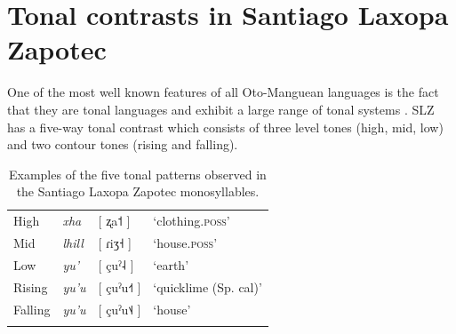 
\section{Tonal contrasts in Santiago Laxopa Zapotec} \label{sec:SLZ-tones}
One of the most well known features of all Oto-Manguean languages is the fact that they are tonal languages and exhibit a large range of tonal systems \citep{pikeProblemsZapotecTone1948,renschComparativeOtomangueanPhonology1976,josserandMixtecDialectHistory1983,silvermanLaryngealComplexityOtomanguean1997,beamdeazconaProblemsZapotecTone2007,dicanioItunyosoTrique2010,dicanioCoarticulationToneGlottal2012,elliottChicahuaxtlaTriqui2016,campbellOtomangueanHistoricalLinguistics2017,campbellOtomangueanHistoricalLinguistics2017a,lillehaugenOtomangueanLanguages2019,eischensTonePhonationPhonologyPhonetics2022}. SLZ has a five-way tonal contrast which consists of three level tones (high, mid, low) and two contour tones (rising and falling). 

\begin{table}[!h]
	\centering
	\caption{Examples of the five tonal patterns observed in the Santiago Laxopa Zapotec monosyllables.}
	\label{tab:tones}
	\begin{tabular}{llll}
	\lsptoprule
	High   	 &  \textit{xha}   &  [ ʐa˦ ] & `clothing.\textsc{poss}'\\
	Mid    	 &  \textit{lhill} 	& [ ɾiʒ˧ ] & `house.\textsc{poss}' \\
	Low   	 &  \textit{yu'} 	& [ çuˀ˨ ] & `earth'\\
	Rising	 &  \textit{yu'u} 	& [ çuˀu˧˦ ] & `quicklime (Sp. cal)' \\
	Falling  &  \textit{yu'u}  &  [ çuˀu˦˨ ] &	`house' \\
	\lspbottomrule
	\end{tabular}
\end{table}

